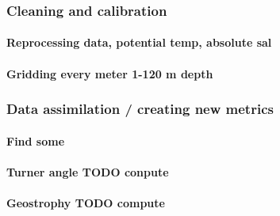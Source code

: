 \documentclass[12pt,a4paper]{article}
\begin{document}
\subsubsection{Cleaning and calibration}
\paragraph{Reprocessing data, potential temp, absolute sal}
\paragraph{Gridding every meter 1-120 m depth}

\subsubsection{Data assimilation / creating new metrics}
\paragraph{Find some}
\paragraph{Turner angle TODO conpute}
\paragraph{Geostrophy TODO compute}
\end{document}
